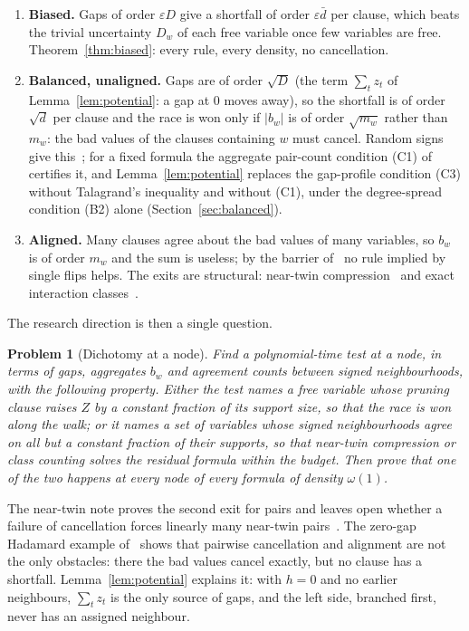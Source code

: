 \documentclass[11pt,a4paper]{article}
\newtheorem{problem}[theorem]{Problem}
\theoremstyle{definition}
\theoremstyle{remark}
\begin{document}
\begin{enumerate}
 \item \textbf{Biased.} Gaps of order $\varepsilon D$ give a shortfall of order
 $\varepsilon\bar d$ per clause, which beats the trivial uncertainty $D_w$ of
 each free variable once few variables are free. Theorem~\ref{thm:biased}:
 every rule, every density, no cancellation.
 \item \textbf{Balanced, unaligned.} Gaps are of order $\sqrt D$ (the term
 $\sum_tz_t$ of Lemma~\ref{lem:potential}: a gap at $0$ moves away), so the
 shortfall is of order $\sqrt d$ per clause and the race is won only if
 $|b_w|$ is of order $\sqrt{m_w}$ rather than $m_w$: the bad values of the
 clauses containing $w$ must cancel. Random signs give this~\cite{N8}; for a
 fixed formula the aggregate pair-count condition (C1) of~\cite{CC} certifies
 it, and Lemma~\ref{lem:potential} replaces the gap-profile condition (C3)
 without Talagrand's inequality and without (C1), under the degree-spread
 condition (B2) alone (Section~\ref{sec:balanced}).
 \item \textbf{Aligned.} Many clauses agree about the bad values of many
 variables, so $b_w$ is of order $m_w$ and the sum is useless; by the barrier
 of~\cite[Section~9]{N4} no rule implied by single flips helps. The exits are
 structural: near-twin compression~\cite{NT} and exact interaction
 classes~\cite{N5}.
\end{enumerate}

The research direction is then a single question.

\begin{problem}[Dichotomy at a node]\label{prob:dichotomy}
Find a polynomial-time test at a node, in terms of gaps, aggregates $b_w$ and
agreement counts between signed neighbourhoods, with the following property.
Either the test names a free variable whose pruning clause raises $Z$ by a
constant fraction of its support size, so that the race is won along the walk;
or it names a set of variables whose signed neighbourhoods agree on all but a
constant fraction of their supports, so that near-twin compression or class
counting solves the residual formula within the budget. Then prove that one of
the two happens at every node of every formula of density $\omega(1)$.
\end{problem}

The near-twin note proves the second exit for pairs and leaves open whether a
failure of cancellation forces linearly many near-twin pairs~\cite[Section~5]{NT}.
The zero-gap Hadamard example of~\cite[Section~6]{CC} shows that pairwise
cancellation and alignment are not the only obstacles: there the bad values
cancel exactly, but no clause has a shortfall. Lemma~\ref{lem:potential}
explains it: with $h=0$ and no earlier neighbours, $\sum_tz_t$ is the only
source of gaps, and the left side, branched first, never has an assigned
neighbour.
\end{document}
